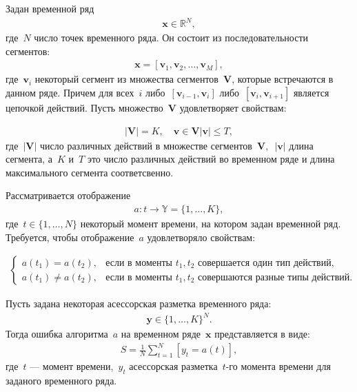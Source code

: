 Задан временной ряд
\[
\label{eq:st:1}
\begin{aligned}
\textbf{x} \in \mathbb{R}^{N},
\end{aligned}
\]
где~$N$ число точек временного ряда. Он состоит из последовательности сегментов:
\[
\label{eq:st:2}
\begin{aligned}
\textbf{x} = [\textbf{v}_1, \textbf{v}_2, \ldots, \textbf{v}_M],
\end{aligned}
\]
где~$\textbf{v}_i$ некоторый сегмент из множества сегментов~$\mathbf{V}$, которые встречаются в данном ряде. 
Причем для всех~$i$ либо~$[\textbf{v}_{i-1},\textbf{v}_{i}]$ либо~$[\textbf{v}_{i},\textbf{v}_{i+1}]$  является цепочкой действий. Пусть множество~$\mathbf{V}$ удовлетворяет свойствам:

\[
\label{eq:st:3}
\begin{aligned}
\left|\mathbf{V}\right| = K, \quad \textbf{v} \in \mathbf{V} \left|\textbf{v}\right| \leq T,
\end{aligned}
\]
где~$\left|\mathbf{V}\right|$ число различных действий в множестве сегментов~$\mathbf{V},$~$\left|\textbf{v}\right|$ длина сегмента, а~$K$ и~$T$ это число различных действий во временном ряде и длина максимального сегмента соответсвенно.

Рассматривается отображение
\[
\label{eq:st:4}
\begin{aligned}
a : t \to \mathbb{Y} = \{1,\ldots, K\}, 
\end{aligned}
\]
где~$t \in \{1,\ldots, N\}$ некоторый момент времени, на котором задан временной ряд.
Требуется, чтобы отображение~$a$ удовлетворяло свойствам:

\[
\label{eq:st:5}
\begin{aligned}
\begin{cases}
    a\left(t_1\right) = a\left(t_2\right), &  \text{если в моменты } t_1, t_2 \text{ совершается один тип действий},\\
    a\left(t_1\right) \not= a\left(t_2\right), &  \text{если в моменты } t_1, t_2 \text{ совершаются разные типы действий.}
\end{cases}
\end{aligned}
\]

Пусть задана некоторая асессорская разметка временного ряда:
\[
\label{eq:st:6}
\begin{aligned}
\textbf{y} \in \{1,\ldots,K\}^{N}.
\end{aligned}
\]
Тогда ошибка алгоритма~$a$ на временном ряде~$\textbf{x}$ представляется в виде:
\[
\label{eq:st:7}
\begin{aligned}
S = \frac{1}{N}\sum_{t=1}^{N}[y_t = a\left(t\right)],
\end{aligned}
\]
где~$t$ --- момент времени,~$y_t$ асессорская разметка~$t$-го момента времени для заданого временного ряда.


